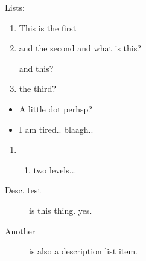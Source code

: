 \documentclass{article}
\begin{document}
Lists:

\begin{enumerate}
\item This is the first
\item and the second
and what is this?

and this?
\item the third?
\end{enumerate}

\begin{itemize}
\item A little dot perhsp?
\item I am tired.. blaagh..
\end{itemize}

\begin{enumerate}
\item \begin{enumerate}
	\item two levels...
\end{enumerate}
\end{enumerate}


\begin{description}
\item[Desc. test] is this thing. yes.
\item[Another] is also a description list item.
\end{description}
\end{document}
